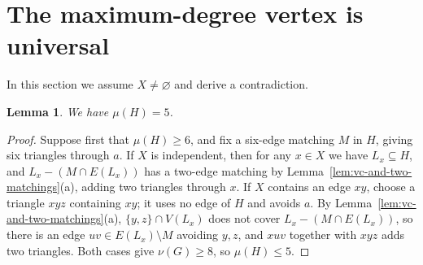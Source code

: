\documentclass[11pt]{article}
\newtheorem{lemma}[theorem]{Lemma}
\begin{document}
\section{The maximum-degree vertex is universal}

In this section we assume $X\neq\varnothing$ and derive a contradiction.

\begin{lemma}\label{lem:mu5}
We have $\mu(H)=5$.
\end{lemma}

\begin{proof}
Suppose first that $\mu(H)\geq 6$, and fix a six-edge matching $M$ in $H$, giving six triangles through $a$. If $X$ is independent, then for any $x\in X$ we have $L_x\subseteq H$, and $L_x-(M\cap E(L_x))$ has a two-edge matching by Lemma~\ref{lem:vc-and-two-matchings}(a), adding two triangles through $x$. If $X$ contains an edge $xy$, choose a triangle $xyz$ containing $xy$; it uses no edge of $H$ and avoids $a$. By Lemma~\ref{lem:vc-and-two-matchings}(a), $\{y,z\}\cap V(L_x)$ does not cover $L_x-(M\cap E(L_x))$, so there is an edge $uv\in E(L_x)\setminus M$ avoiding $y,z$, and $xuv$ together with $xyz$ adds two triangles. Both cases give $\nu(G)\geq 8$, so $\mu(H)\leq 5$.


\end{proof}
\end{document}
